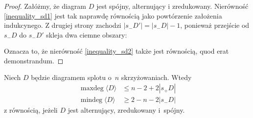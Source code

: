 \begin{proof}
    Załóżmy, że diagram $D$ jest spójny, alternujący i zredukowany.
    Nierówność \ref{inequality_sd1} jest tak naprawdę równością jako powtórzenie założenia indukcynego.
    Z drugiej strony zachodzi $|s_-D'|=|s_-D|-1$, ponieważ przejście od $s_-D$ do $s_-D'$ skleja dwa ciemne obszary:

    Oznacza to, że nierówność \ref{inequality_sd2} także jest równością, quod erat demonstrandum.
\end{proof}

 \begin{lemma}
    \label{lem:pretait_lemma_2}
    Niech $D$ będzie diagramem splotu o~$n$ skrzyżowaniach.
    Wtedy
    \begin{align}
        \operatorname{maxdeg} \langle D \rangle & \le n - 2 + 2|s_+D| \\
        \operatorname{mindeg} \langle D \rangle & \ge 2 - n - 2|s_-D|
    \end{align}
    z równością, jeżeli $D$ jest alternujący, zredukowany i~spójny.
\end{lemma}

